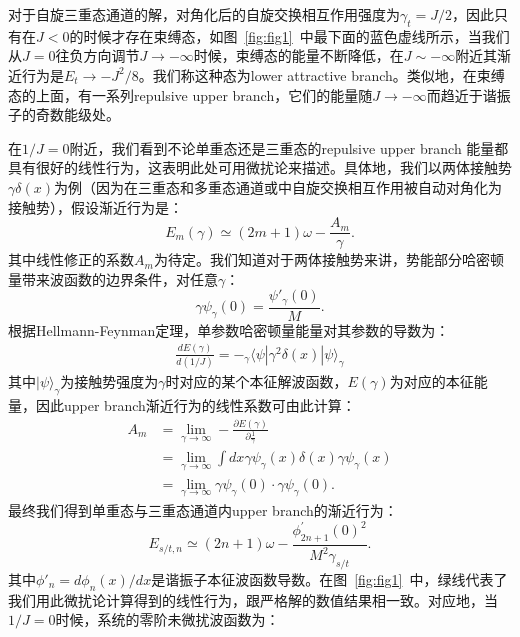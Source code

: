 对于自旋三重态通道的解，对角化后的自旋交换相互作用强度为$\gamma_t=J/2$，因此只有在$J<0$的时候才存在束缚态，如图~\ref{fig:fig1}~中最下面的蓝色虚线所示，当我们从$J=0$往负方向调节$J\to-\infty$时候，束缚态的能量不断降低，在$J\sim -\infty$附近其渐近行为是$E_t\rightarrow -J^2/8$。我们称这种态为lower attractive branch。类似地，在束缚态的上面，有一系列repulsive upper branch，它们的能量随$J\to-\infty$而趋近于谐振子的奇数能级处。

在$1/J=0$附近，我们看到不论单重态还是三重态的repulsive upper branch 能量都具有很好的线性行为，这表明此处可用微扰论来描述。具体地，我们以两体接触势$\gamma\delta(x)$为例（因为在三重态和多重态通道或中自旋交换相互作用被自动对角化为接触势），假设渐近行为是：
\begin{equation}
    E_m(\gamma) \simeq  (2m+1)\omega - \frac{A_m}{\gamma}.
\end{equation}
其中线性修正的系数$A_m$为待定。我们知道对于两体接触势来讲，势能部分哈密顿量带来波函数的边界条件，对任意$\gamma$：
\begin{equation}
    \gamma\psi_\gamma(0) = \frac{\psi'_\gamma(0)}{M}.
\end{equation}
根据Hellmann-Feynman定理，单参数哈密顿量能量对其参数的导数为：
\begin{equation}
\begin{split}
    \frac{dE(\gamma)}{d(1/J)} = -{}_\gamma\langle\psi| \gamma^2\delta(x) |\psi\rangle_\gamma
\end{split}
\end{equation}
其中$|\psi\rangle_\gamma$为接触势强度为$\gamma$时对应的某个本征解波函数，$E(\gamma)$为对应的本征能量，因此upper branch渐近行为的线性系数可由此计算：
\begin{equation}
\begin{split}
    A_m &= \lim_{\gamma\to \infty} -\frac{\partial E(\gamma)}{\partial \frac{1}{\gamma} }\\
    \quad &= \lim_{\gamma\to \infty} \int dx \gamma\psi_\gamma(x)\delta(x)\gamma\psi_\gamma(x) \\
    \quad &= \lim_{\gamma\to \infty} \gamma\psi_\gamma(0)\cdot \gamma\psi_\gamma(0). 
\end{split}
\end{equation}
最终我们得到单重态与三重态通道内upper branch的渐近行为：
\begin{equation}
E_{s/t,n} \simeq (2n+1)\omega -\frac{\phi^{'}_{2n+1}(0)^2}{M^2\gamma_{s/t}}. \label{asymptotic}
\end{equation}
其中$\phi'_n=d\phi_n(x)/dx$是谐振子本征波函数导数。在图~\ref{fig:fig1}~中，绿线代表了我们用此微扰论计算得到的线性行为，跟严格解的数值结果相一致。对应地，当$1/J=0$时候，系统的零阶未微扰波函数为：
